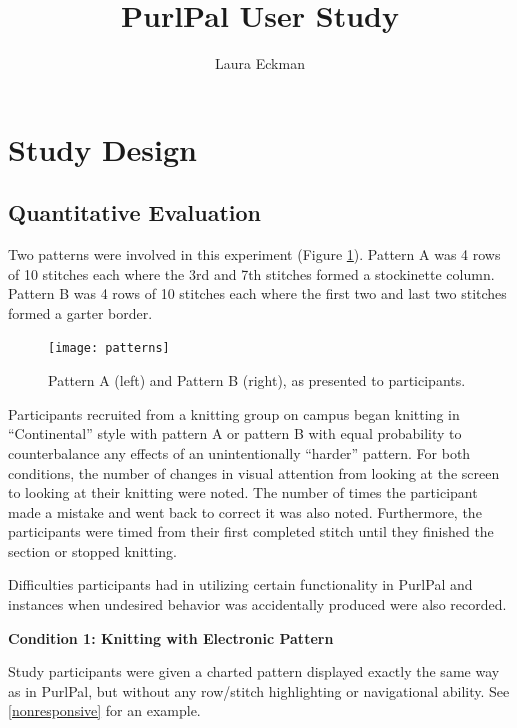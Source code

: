 \documentclass{article}
\begin{document}
\title{PurlPal User Study}
\author{Laura Eckman}
\maketitle

\section{Study Design}

\subsection{Quantitative Evaluation}

Two patterns were involved in this experiment (Figure \ref{patterns}).
Pattern A was 4 rows of 10 stitches each where the 3rd and 7th stitches formed a stockinette column.
Pattern B was 4 rows of 10 stitches each where the first two and last two stitches formed a garter border.

\begin{figure} %
    \centering
    \texttt{[image: patterns]}
    \caption{Pattern A (left) and Pattern B (right), as presented to participants.} \label{patterns}
\end{figure}


Participants recruited from a knitting group on campus began knitting in ``Continental'' style with pattern A or pattern B with equal probability to counterbalance any effects of an unintentionally ``harder'' pattern.
For both conditions, the number of changes in visual attention from looking at the screen to looking at their knitting were noted.
The number of times the participant made a mistake and went back to correct it was also noted.
Furthermore, the participants were timed from their first completed stitch until they finished the section or stopped knitting.

Difficulties participants had in utilizing certain functionality in PurlPal and instances when undesired behavior was accidentally produced were also recorded.

\medskip

\textbf{Condition 1: Knitting with Electronic Pattern}

Study participants were given a charted pattern displayed exactly the same way as in PurlPal, but without any row/stitch highlighting or navigational ability. See \ref{nonresponsive} for an example.
\end{document}

